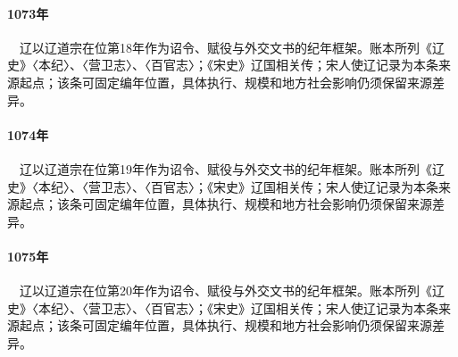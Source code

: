 \paragraph{1073年}　辽以辽道宗在位第18年作为诏令、赋役与外交文书的纪年框架。账本所列《辽史》〈本纪〉、〈营卫志〉、〈百官志〉；《宋史》辽国相关传；宋人使辽记录为本条来源起点；该条可固定编年位置，具体执行、规模和地方社会影响仍须保留来源差异。

\paragraph{1074年}　辽以辽道宗在位第19年作为诏令、赋役与外交文书的纪年框架。账本所列《辽史》〈本纪〉、〈营卫志〉、〈百官志〉；《宋史》辽国相关传；宋人使辽记录为本条来源起点；该条可固定编年位置，具体执行、规模和地方社会影响仍须保留来源差异。

\paragraph{1075年}　辽以辽道宗在位第20年作为诏令、赋役与外交文书的纪年框架。账本所列《辽史》〈本纪〉、〈营卫志〉、〈百官志〉；《宋史》辽国相关传；宋人使辽记录为本条来源起点；该条可固定编年位置，具体执行、规模和地方社会影响仍须保留来源差异。
